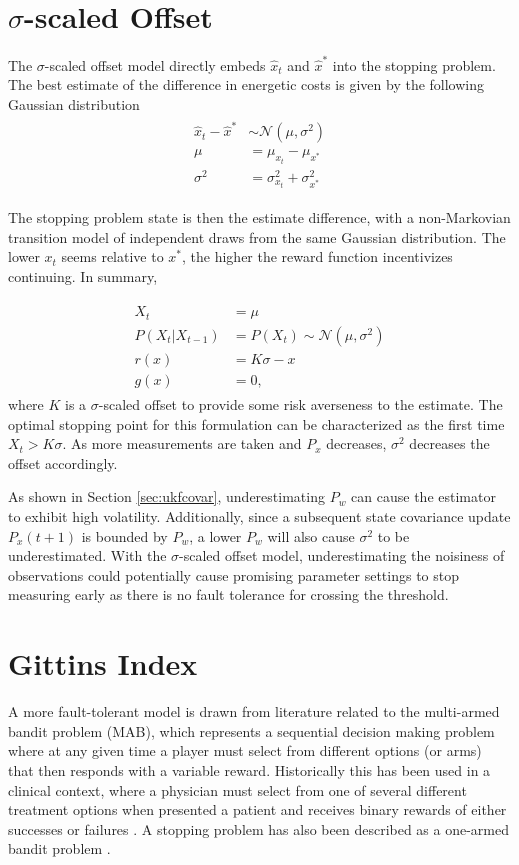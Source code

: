 \section{$\sigma$-scaled Offset}
The $\sigma$-scaled offset model directly embeds $\hat{x}_t$ and $\hat{x}^*$ into the stopping problem. The best estimate of the difference in energetic costs is given by the following Gaussian distribution
\begin{align}
\begin{split}
  \hat{x}_t - \hat{x}^* &\sim \mathcal{N}(\mu, \sigma^2)\\
  \mu &= \mu_{x_t} - \mu_{x^*}\\
  \sigma^2 &= \sigma^2_{x_t} + \sigma^2_{x^*}
\end{split}
\end{align}

The stopping problem state is then the estimate difference, with a non-Markovian transition model of independent draws from the same Gaussian distribution. The lower $x_t$ seems relative to $x^*$, the higher the reward function incentivizes continuing. In summary,

\begin{align}
\begin{split}
  X_t &= \mu\\
  P(X_t \vert X_{t-1}) &= P(X_t) \sim \mathcal{N}(\mu, \sigma^2)\\
  r(x) &= K\sigma-x\\
  g(x) &= 0,
\end{split}
\end{align}
where $K$ is a $\sigma$-scaled offset to provide some risk averseness to the estimate. The optimal stopping point for this formulation can be characterized as the first time $X_t > K\sigma$. As more measurements are taken and $P_{x}$ decreases, $\sigma^2$ decreases the offset accordingly.

As shown in Section \ref{sec:ukfcovar}, underestimating $P_w$ can cause the estimator to exhibit high volatility. Additionally, since a subsequent state covariance update $P_x(t+1)$ is bounded by $P_w$, a lower $P_w$ will also cause $\sigma^2$ to be underestimated. With the $\sigma$-scaled offset model, underestimating the noisiness of observations could potentially cause promising parameter settings to stop measuring early as there is no fault tolerance for crossing the threshold. 

\section{Gittins Index}
A more fault-tolerant model is drawn from literature related to the multi-armed bandit problem (MAB), which represents a sequential decision making problem where at any given time a player must select from different options (or arms) that then responds with a variable reward. Historically this has been used in a clinical context, where a physician must select from one of several different treatment options when presented a patient and receives binary rewards of either successes or failures \citep{Villar2015}. A stopping problem has also been described as a one-armed bandit problem \citep{FergusonStopping2006}.

